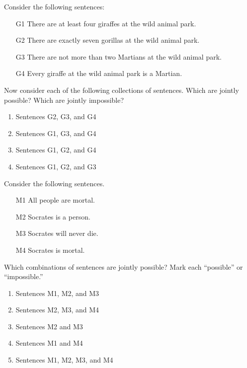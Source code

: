 \noindent \problempart Consider the following sentences: 
\begin{enumerate}%
\item[G1] \label{itm:at_least_four}There are at least four giraffes at the wild animal park.
\item[G2] \label{itm:exactly_seven} There are exactly seven gorillas at the wild animal park.
\item[G3] \label{itm:not_more_than_two} There are not more than two Martians at the wild animal park.
\item[G4] \label{itm:martians} Every giraffe at the wild animal park is a Martian.
\end{enumerate}

Now consider each of the following collections of sentences. Which are jointly possible? Which are jointly impossible?
\begin{enumerate}
\item Sentences G2, G3, and G4
\item Sentences G1, G3, and G4
\item Sentences G1, G2, and G4
\item Sentences G1, G2, and G3
\end{enumerate}

\problempart Consider the following sentences.
\begin{enumerate}%
\item[M1] \label{itm:allmortal} All people are mortal.
\item[M2] \label{itm:socperson} Socrates is a person.
\item[M3] \label{itm:socnotdie} Socrates will never die.
\item[M4] \label{itm:socmortal} Socrates is mortal.
\end{enumerate}
Which combinations of sentences are jointly possible? Mark each ``possible'' or ``impossible.''
\begin{enumerate}
\item Sentences M1, M2, and M3
\item Sentences M2, M3, and M4
\item Sentences M2 and M3
\item Sentences M1 and M4
\item Sentences M1, M2, M3, and M4
\end{enumerate}

